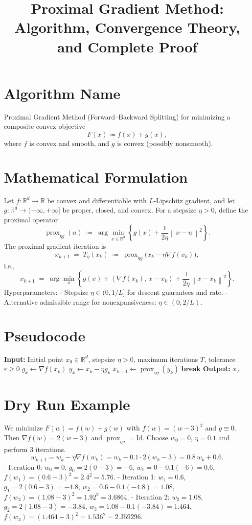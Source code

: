 \documentclass[11pt]{article}
\title{Proximal Gradient Method: Algorithm, Convergence Theory, and Complete Proof}
\author{}
\date{}
\newcommand{\prox}{\operatorname{prox}}
\newcommand{\R}{\mathbb{R}}
\newcommand{\inner}[2]{\left\langle #1,\, #2 \right\rangle}
\newcommand{\norm}[1]{\left\lVert #1 \right\rVert}
\begin{document}
\maketitle

\section*{Algorithm Name}
Proximal Gradient Method (Forward--Backward Splitting) for minimizing a composite convex objective
\[
F(x) \coloneqq f(x) + g(x),
\]
where $f$ is convex and smooth, and $g$ is convex (possibly nonsmooth).

\section*{Mathematical Formulation}
Let $f:\R^d\to\R$ be convex and differentiable with $L$-Lipschitz gradient, and let $g:\R^d\to(-\infty,+\infty]$ be proper, closed, and convex. For a stepsize $\eta>0$, define the proximal operator
\[
\prox_{\eta g}(u) \;\coloneqq\; \arg\min_{x\in\R^d}\left\{ g(x) + \frac{1}{2\eta}\norm{x-u}^2 \right\}.
\]
The proximal gradient iteration is
\[
x_{k+1} \;=\; T_\eta(x_k) \;\coloneqq\; \prox_{\eta g}\bigl(x_k - \eta \nabla f(x_k)\bigr),
\]
i.e.,
\[
x_{k+1} \;=\; \arg\min_{x}\left\{ g(x) + \inner{\nabla f(x_k)}{x-x_k} + \frac{1}{2\eta}\norm{x-x_k}^2 \right\}.
\]
Hyperparameters:
- Stepsize $\eta \in (0, 1/L]$ for descent guarantees and rate.
- Alternative admissible range for nonexpansiveness: $\eta \in (0, 2/L)$.

\section*{Pseudocode}
\begin{algorithm}[H]
\caption{Proximal Gradient Method}
\begin{algorithmic}[1]
\State \textbf{Input:} Initial point $x_0\in\R^d$, stepsize $\eta>0$, maximum iterations $T$, tolerance $\varepsilon\ge 0$
  \State $g_k \gets \nabla f(x_k)$
  \State $y_k \gets x_k - \eta g_k$
  \State $x_{k+1} \gets \prox_{\eta g}(y_k)$
  \If{$\norm{x_{k+1}-x_k}\le \varepsilon$}
     \State \textbf{break}
  \EndIf
\EndFor
\State \textbf{Output:} $x_T$
\end{algorithmic}
\end{algorithm}

\section*{Dry Run Example}
We minimize $F(w)=f(w)+g(w)$ with $f(w)=(w-3)^2$ and $g\equiv 0$. Then $\nabla f(w)=2(w-3)$ and $\prox_{\eta g}=\mathrm{Id}$.
Choose $w_0=0$, $\eta=0.1$ and perform 3 iterations.
\[
w_{k+1} = w_k - \eta \nabla f(w_k) = w_k - 0.1\cdot 2(w_k-3) = 0.8\,w_k + 0.6.
\]
- Iteration 0: $w_0=0$, $g_0=2(0-3)=-6$, $w_1=0-0.1(-6)=0.6$, $f(w_1)=(0.6-3)^2=2.4^2=5.76$.
- Iteration 1: $w_1=0.6$, $g_1=2(0.6-3)=-4.8$, $w_2=0.6-0.1(-4.8)=1.08$, $f(w_2)=(1.08-3)^2=1.92^2=3.6864$.
- Iteration 2: $w_2=1.08$, $g_2=2(1.08-3)=-3.84$, $w_3=1.08-0.1(-3.84)=1.464$, $f(w_3)=(1.464-3)^2=1.536^2=2.359296$.
\end{document}
